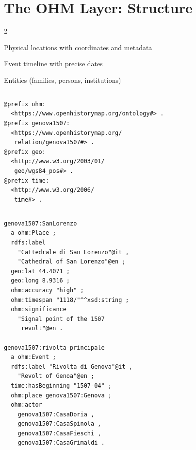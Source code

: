 
\section{%
  {The OHM Layer: Structure}%
}
\label{sec:ohm-instructions}

\begin{multicols}{2}

\begin{description}[leftmargin=1.5cm]
  \item[\texttt{places}]
    {Physical locations with coordinates and metadata}
  \item[\texttt{events}]
    {Event timeline with precise dates}
  \item[\texttt{actors}]
    {Entities (families, persons, institutions)}
\end{description}

\subsection{%
}

\begin{verbatim}
@prefix ohm:
  <https://www.openhistorymap.org/ontology#> .
@prefix genova1507:
  <https://www.openhistorymap.org/
   relation/genova1507#> .
@prefix geo:
  <http://www.w3.org/2003/01/
   geo/wgs84_pos#> .
@prefix time:
  <http://www.w3.org/2006/
   time#> .
\end{verbatim}

\columnbreak

\subsection{%
}

\begin{verbatim}
genova1507:SanLorenzo
  a ohm:Place ;
  rdfs:label
    "Cattedrale di San Lorenzo"@it ,
    "Cathedral of San Lorenzo"@en ;
  geo:lat 44.4071 ;
  geo:long 8.9316 ;
  ohm:accuracy "high" ;
  ohm:timespan "1118/"^^xsd:string ;
  ohm:significance
    "Signal point of the 1507
     revolt"@en .

genova1507:rivolta-principale
  a ohm:Event ;
  rdfs:label "Rivolta di Genova"@it ,
    "Revolt of Genoa"@en ;
  time:hasBeginning "1507-04" ;
  ohm:place genova1507:Genova ;
  ohm:actor
    genova1507:CasaDoria ,
    genova1507:CasaSpinola ,
    genova1507:CasaFieschi ,
    genova1507:CasaGrimaldi .
\end{verbatim}

\end{multicols}

